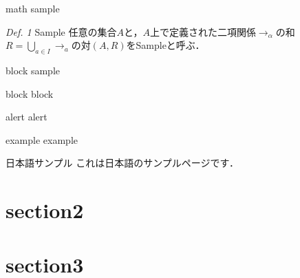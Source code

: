 \documentclass[aspectratio=1610,dvipdfmx,ja=standard,14pt]{beamer}
\begin{document}
\begin{frame}{math sample}
    \begin{block}{\textit{Def. 1} Sample}
        任意の集合$A$と，$A$上で定義された二項関係$\to_{\alpha}$の和$R = \bigcup_{a \in I} \to_a $の対$(A, R)$をSampleと呼ぶ．
    \end{block}
\end{frame}

\begin{frame}{block sample}
    \begin{block}{block}
        block
    \end{block}
    \begin{alertblock}{alert}
        alert
    \end{alertblock}
    \begin{exampleblock}{example}
        example
    \end{exampleblock}
\end{frame}

\begin{frame}{日本語サンプル}
    これは日本語のサンプルページです．
\end{frame}

\section{section2}

\begin{frame}
    \tableofcontents[currentsection]
\end{frame}
%
\section{section3}

\begin{frame}
    \tableofcontents[currentsection]
\end{frame}
%
%
%
%
\end{document}

